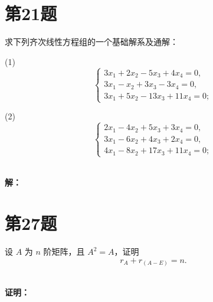 \documentclass[a4paper, 12pt]{ctexart}
\begin{document}
\section{第21题}
\begin{exercise}
求下列齐次线性方程组的一个基础解系及通解：

(1)
\[
\left\{
\begin{matrix}
3x_{1}+2x_{2}-5x_{3}+4x_{4}=0,\\
3x_{1}-x_{2}+3x_{3}-3x_{4}=0,\\
3x_{1}+5x_{2}-13x_{3}+11x_{4}=0;
\end{matrix}
\right.
\]

(2)
\[
\left\{
\begin{matrix}
2x_{1}-4x_{2}+5x_{3}+3x_{4}=0,\\
3x_{1}-6x_{2}+4x_{3}+2x_{4}=0,\\
4x_{1}-8x_{2}+17x_{3}+11x_{4}=0;
\end{matrix}
\right.
\]

\end{exercise}~\\
\noindent\textbf{解：}
\section{第27题}
\begin{exercise}
设 $A$ 为 $n$ 阶矩阵，且 $A^2 = A$，证明
\[
r_{A} +r_{(A-E)}  = n.
\]
\end{exercise}~\\
\noindent\textbf{证明：}
\end{document}
